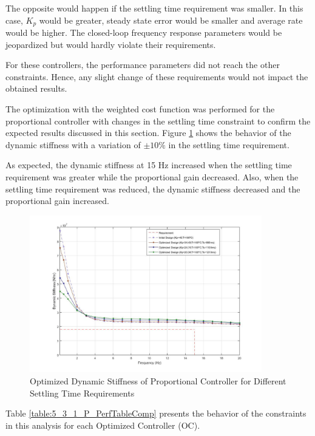 The opposite would happen if the settling time requirement was smaller. In this case, $K_p$ would be greater, steady state error would be smaller and average rate would be higher. The closed-loop frequency response parameters would be jeopardized but would hardly violate their requirements.

For these controllers, the performance parameters did not reach the other constraints. Hence, any slight change of these requirements would not impact the obtained results.

The optimization with the weighted cost function was performed for the proportional controller with changes in the settling time constraint to confirm the expected results discussed in this section. Figure \ref{fig:5_3_1_P_DynStifTsComp} shows the behavior of the dynamic stiffness with a variation of $\pm10\%$ in the settling time requirement. 

As expected, the dynamic stiffness at 15 Hz increased when the settling time requirement was greater while the proportional gain decreased. Also, when the settling time requirement was reduced, the dynamic stiffness decreased and the proportional gain increased.

\begin{figure}[H]
	\centering
	\centerline{\includegraphics[width=0.9\textwidth]{Figuras/5.OptimizationResults/5-3-1-P-DynStiff-TsComp.jpg}}
	\caption{Optimized Dynamic Stiffness of Proportional Controller for Different Settling Time Requirements}
	\label{fig:5_3_1_P_DynStifTsComp}
\end{figure}

Table \ref{table:5_3_1_P_PerfTableComp} presents the behavior of the constraints in this analysis for each Optimized Controller (OC).

